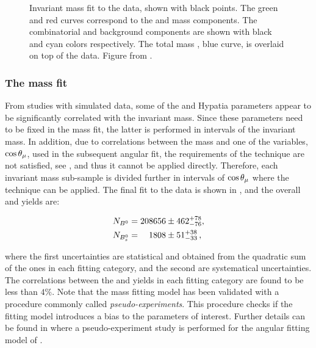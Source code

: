 \begin{figure}[t]
  \centering
  \scalebox{0.5}{}
  \caption{Invariant mass fit to the data, shown with black points. The green and red curves correspond to the \BdJpsiKpi and
           \BsJpsiKpi mass \pdf components. The combinatorial and \LbJpsippi background components are shown with black and cyan
           colors respectively. The total mass \pdf, blue curve, is overlaid on top of the data. Figure from \cite{bsjpsikst-paper}. }
  \label{mass_plot}
\end{figure}

\subsubsection{The mass fit}
From studies with simulated data, some of the \Bs and \Bd Hypatia parameters appear to be significantly correlated with the \mkpi
invariant mass. Since these parameters need to be fixed in the mass fit, the latter is performed in intervals of the
\mkpi invariant mass. In addition, due to correlations between the mass and one of the variables, $\cos\theta_{\mu}$, used in
the subsequent angular fit, the requirements of the \sPlot technique are not satisfied, see ,
and thus it cannot be applied directly. Therefore, each \mkpi invariant mass sub-sample is divided further in intervals of
$\cos\theta_{\mu}$ where the \sPlot technique can be applied. The final fit to the data is shown in , and the
overall \BsJpsiKst and \BdJpsiKst yields are:

\begin{align}
  \centering
  N_{\Bd} &= 208656  \pm  462 ^{+ 78}_{-76}, \\
  N_{\Bs} &= \phantom{00}1808  \pm  51 ^{+ 38}_{-33} \, ,
  \label{signal_yields}
\end{align}

\noindent where the first uncertainties are statistical and obtained from the quadratic sum of the ones in each fitting category,
and the second are systematical uncertainties. The correlations between the \Bd and \Bs yields in each fitting category
are found to be less than $4\%$. Note that the mass fitting model has been validated with a procedure commonly called {\it pseudo-experiments}.
This procedure checks if the fitting model introduces a bias to the parameters of interest. Further details can be found in
 where a pseudo-experiment study is performed for the angular fitting model of .

